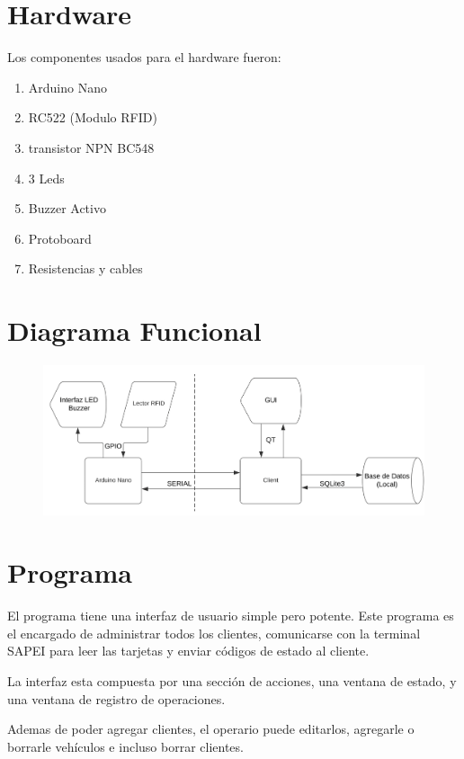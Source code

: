 \documentclass[a4paper, 12pt]{report}
\begin{document}
\newpage
\section{Hardware}
    Los componentes usados para el hardware fueron:
    \begin{enumerate}
        \item Arduino Nano
        \item RC522 (Modulo RFID)
        \item transistor NPN BC548
        \item 3 Leds
        \item Buzzer Activo
        \item Protoboard
        \item Resistencias y cables
    \end{enumerate}

\section{Diagrama Funcional}
    \begin{figure}[h]
        \centering
        \includegraphics[width=1\textwidth]{./image1.png}
    \end{figure}

\section{Programa}
    El programa tiene una interfaz de usuario simple pero potente. Este programa es el encargado de administrar todos
    los clientes, comunicarse con la terminal SAPEI para leer las tarjetas y enviar códigos de estado al cliente.

    La interfaz esta compuesta por una sección de acciones, una ventana de estado, y una ventana de registro de
    operaciones.

    Ademas de poder agregar clientes, el operario puede editarlos, agregarle o borrarle vehículos e incluso borrar
    clientes.
\end{document}
